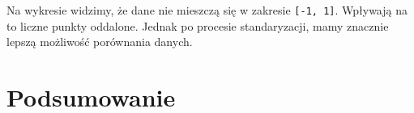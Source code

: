 \documentclass[a4paper,12pt,twoside]{article}
\begin{document}
Na wykresie widzimy, że dane nie mieszczą się w zakresie \texttt{[-1, 1]}. Wpływają na to liczne punkty oddalone.
Jednak po procesie standaryzacji, mamy znacznie lepszą możliwość porównania danych.

\section{Podsumowanie}
\bigskip


\end{document}
